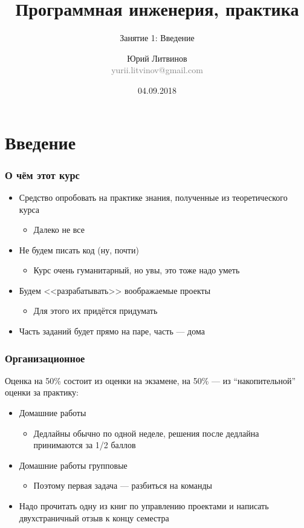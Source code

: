 \documentclass[xetex,mathserif,serif]{beamer}
\title{Программная инженерия, практика}
\subtitle{Занятие 1: Введение}
\author[Юрий Литвинов]{Юрий Литвинов\\\small{\textcolor{gray}{yurii.litvinov@gmail.com}}}
\date{04.09.2018}
\begin{document}
	\frame{\titlepage}

	\section{Введение}

	\begin{frame}
		\frametitle{О чём этот курс}
		\begin{itemize}
			\item Средство опробовать на практике знания, полученные из теоретического курса
			\begin{itemize}
				\item Далеко не все
			\end{itemize}
			\item Не будем писать код (ну, почти)
			\begin{itemize}
				\item Курс очень гуманитарный, но увы, это тоже надо уметь
			\end{itemize}
			\item Будем <<разрабатывать>> воображаемые проекты
			\begin{itemize}
				\item Для этого их придётся придумать
			\end{itemize}
			\item Часть заданий будет прямо на паре, часть --- дома
		\end{itemize}
	\end{frame}

	\begin{frame}
		\frametitle{Организационное}
		Оценка на 50\% состоит из оценки на экзамене, на 50\% --- из ``накопительной'' оценки за практику:
		\begin{itemize}
			\item Домашние работы
			\begin{itemize}
				\item Дедлайны обычно по одной неделе, решения после дедлайна принимаются за 1/2 баллов
			\end{itemize}
			\item Домашние работы групповые
			\begin{itemize}
				\item Поэтому первая задача --- разбиться на команды
			\end{itemize}
			\item Надо прочитать одну из книг по управлению проектами и написать двухстраничный отзыв к концу семестра
		\end{itemize}
	\end{frame}
\end{document}

